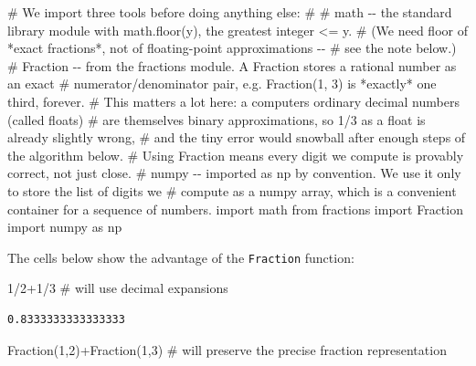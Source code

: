 \documentclass[
  letterpaper,
  DIV=11,
  numbers=noendperiod]{scrreprt}
\newenvironment{Shaded}{\begin{snugshade}}{\end{snugshade}}
\newcommand{\CommentTok}[1]{\textcolor[rgb]{0.37,0.37,0.37}{#1}}
\newcommand{\DecValTok}[1]{\textcolor[rgb]{0.68,0.00,0.00}{#1}}
\newcommand{\ImportTok}[1]{\textcolor[rgb]{0.00,0.46,0.62}{#1}}
\newcommand{\NormalTok}[1]{\textcolor[rgb]{0.00,0.23,0.31}{#1}}
\newcommand{\OperatorTok}[1]{\textcolor[rgb]{0.37,0.37,0.37}{#1}}
\theoremstyle{plain}
\theoremstyle{plain}
\theoremstyle{definition}
\theoremstyle{definition}
\theoremstyle{definition}
\theoremstyle{plain}
\theoremstyle{plain}
\theoremstyle{remark}
\begin{document}
\begin{Shaded}
\begin{Highlighting}[]
\CommentTok{\# We import three tools before doing anything else:}
\CommentTok{\#}
\CommentTok{\#   math     {-}{-} the standard library module with math.floor(y), the greatest integer \textless{}= y.}
\CommentTok{\#               (We need floor of *exact fractions*, not of floating{-}point approximations {-}{-}}
\CommentTok{\#               see the note below.)}
\CommentTok{\#   Fraction {-}{-} from the \textquotesingle{}fractions\textquotesingle{} module. A Fraction stores a rational number as an exact}
\CommentTok{\#               numerator/denominator pair, e.g. Fraction(1, 3) is *exactly* one third, forever.}
\CommentTok{\#               This matters a lot here: a computer\textquotesingle{}s ordinary decimal numbers (called \textquotesingle{}floats\textquotesingle{})}
\CommentTok{\#               are themselves binary approximations, so 1/3 as a float is already slightly wrong,}
\CommentTok{\#               and the tiny error would snowball after enough steps of the algorithm below.}
\CommentTok{\#               Using Fraction means every digit we compute is provably correct, not just close.}
\CommentTok{\#   numpy    {-}{-} imported as \textquotesingle{}np\textquotesingle{} by convention. We use it only to store the list of digits we}
\CommentTok{\#               compute as a numpy array, which is a convenient container for a sequence of numbers.}
\ImportTok{import}\NormalTok{ math}
\ImportTok{from}\NormalTok{ fractions }\ImportTok{import}\NormalTok{ Fraction}
\ImportTok{import}\NormalTok{ numpy }\ImportTok{as}\NormalTok{ np}
\end{Highlighting}
\end{Shaded}

The cells below show the advantage of the \texttt{Fraction} function:

\begin{Shaded}
\begin{Highlighting}[]
\DecValTok{1}\OperatorTok{/}\DecValTok{2}\OperatorTok{+}\DecValTok{1}\OperatorTok{/}\DecValTok{3}   \CommentTok{\# will use decimal expansions}
\end{Highlighting}
\end{Shaded}

\begin{verbatim}
0.8333333333333333
\end{verbatim}

\begin{Shaded}
\begin{Highlighting}[]
\NormalTok{Fraction(}\DecValTok{1}\NormalTok{,}\DecValTok{2}\NormalTok{)}\OperatorTok{+}\NormalTok{Fraction(}\DecValTok{1}\NormalTok{,}\DecValTok{3}\NormalTok{)   }\CommentTok{\# will preserve the precise fraction representation}
\end{Highlighting}
\end{Shaded}
\end{document}
